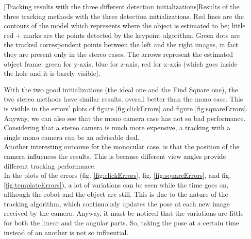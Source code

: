 \begingroup
{}[Tracking results with the three different detection initializations]{Results of the three tracking methods with the three detection initializations. Red lines are the contours of the model which represents where the object is estimated to be; little red $+$ marks are the points detected by the keypoint algorithm. Green dots are the tracked correspondent points between the left and the right images, in fact they are present only in the stereo cases. The arrows represent the estimated object frame: green for y-axis, blue for z-axis, red for x-axis (which goes inside the hole and it is barely visible).}
\label{fig:photoTracking}
\endgroup
\vspace{60px}

With the two good initializations (the ideal one and the Find Square one), the two stereo methods have similar results, overall better than the mono case. This is visible in the errors' plots of figure \ref{fig:clickErrors} and figure \ref{fig:squareErrors}. Anyway, we can also see that the mono camera case has not so bad performance. Considering that a stereo camera is much more expensive, a tracking with a single mono camera can be an advisable deal.\\

Another interesting outcome for the monocular case, is that the position of the camera influences the results. This is because different view angles provide different tracking performance.\\

In the plots of the errors (fig. \ref{fig:clickErrors}, fig. \ref{fig:squareErrors}, and fig. \ref{fig:templateErrors}), a lot of variations can be seen while the time goes on, although the robot and the object are still. This is due to the nature of the tracking algorithm, which continuously updates the pose at each new image received by the camera. Anyway, it must be noticed that the variations are little for both the linear and the angular parts. So, taking the pose at a certain time instead of an another is not so influential.\\

